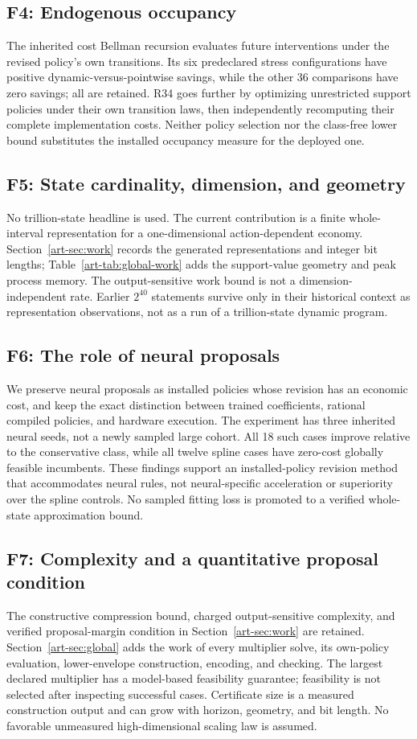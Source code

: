 \subsection{F4: Endogenous occupancy}
The inherited cost Bellman recursion evaluates future interventions under the revised policy's own transitions. Its six predeclared stress configurations have positive dynamic-versus-pointwise savings, while the other 36 comparisons have zero savings; all are retained. R34 goes further by optimizing unrestricted support policies under their own transition laws, then independently recomputing their complete implementation costs. Neither policy selection nor the class-free lower bound substitutes the installed occupancy measure for the deployed one.

\subsection{F5: State cardinality, dimension, and geometry}
No trillion-state headline is used. The current contribution is a finite whole-interval representation for a one-dimensional action-dependent economy. Section~\ref{art-sec:work} records the generated representations and integer bit lengths; Table~\ref{art-tab:global-work} adds the support-value geometry and peak process memory. The output-sensitive work bound is not a dimension-independent rate. Earlier $2^{40}$ statements survive only in their historical context as representation observations, not as a run of a trillion-state dynamic program.

\subsection{F6: The role of neural proposals}
We preserve neural proposals as installed policies whose revision has an economic cost, and keep the exact distinction between trained coefficients, rational compiled policies, and hardware execution. The experiment has three inherited neural seeds, not a newly sampled large cohort. All 18 such cases improve relative to the conservative class, while all twelve spline cases have zero-cost globally feasible incumbents. These findings support an installed-policy revision method that accommodates neural rules, not neural-specific acceleration or superiority over the spline controls. No sampled fitting loss is promoted to a verified whole-state approximation bound.

\subsection{F7: Complexity and a quantitative proposal condition}
The constructive compression bound, charged output-sensitive complexity, and verified proposal-margin condition in Section~\ref{art-sec:work} are retained. Section~\ref{art-sec:global} adds the work of every multiplier solve, its own-policy evaluation, lower-envelope construction, encoding, and checking. The largest declared multiplier has a model-based feasibility guarantee; feasibility is not selected after inspecting successful cases. Certificate size is a measured construction output and can grow with horizon, geometry, and bit length. No favorable unmeasured high-dimensional scaling law is assumed.

